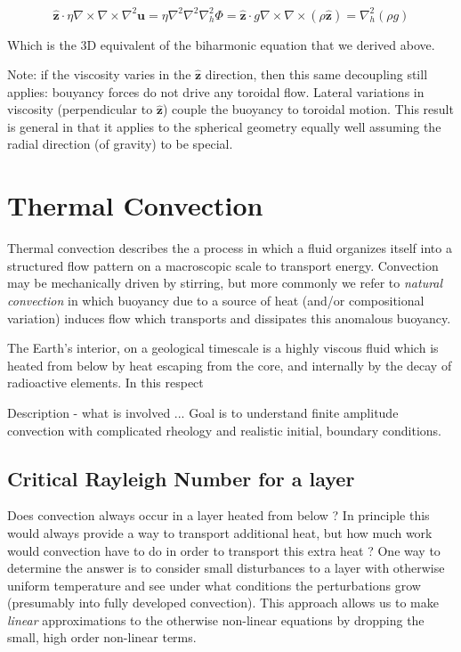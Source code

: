 \documentclass[10pt]{article}
\begin{document}
\begin{equation}
	\hat{\mathbf{z}} \cdot \eta \nabla \times \nabla \times \nabla^2 \mathbf{u} = 
	    \eta \nabla^2 \nabla^2 \nabla_h^2 \Phi = 
		\hat{\mathbf{z}} \cdot g \nabla \times \nabla \times \left( \rho \hat{\mathbf{z}}\right) = 
		 \nabla_h^2 (\rho g)
\end{equation}

Which is the 3D equivalent of the biharmonic equation that we derived above.

Note: if the viscosity varies in the $\hat{\mathbf{z}}$ direction, then this same decoupling still applies: bouyancy forces do not drive any toroidal flow. Lateral variations in viscosity (perpendicular to $\hat{\mathbf{z}}$) couple the buoyancy to toroidal motion. This result is general in that it applies to the spherical geometry equally well assuming the radial direction (of gravity) to be special. 
		
\section{Thermal Convection}
	
Thermal convection describes the a process in which a fluid organizes itself into 
a structured flow pattern on a macroscopic scale to transport energy. Convection
may be mechanically driven by stirring, but more commonly we refer to \emph{natural 
convection} in which buoyancy due to a source of heat (and/or compositional variation) induces
flow which transports and dissipates this anomalous buoyancy.
	
The Earth's interior, on a geological timescale is a highly viscous fluid which is heated
from below by heat escaping from the core, and internally by the decay of radioactive elements.
In this respect 
	
	Description - what is involved ...
	Goal is to understand finite amplitude convection with
	complicated rheology and realistic initial, boundary 
	conditions.
		
		
\subsection{Critical Rayleigh Number for a layer}
	
		Does convection always occur in a layer heated from below ? In
        principle this would always provide a way to transport additional
        heat, but how much work would convection have to do in order to
        transport this extra heat ? One way to determine the answer is to
        consider small disturbances to a layer with otherwise uniform
        temperature and see under what conditions the perturbations grow
        (presumably into fully developed convection). This approach allows us
        to make {\em linear} approximations to the otherwise non-linear
        equations by dropping the small, high order non-linear terms.
		
\end{document}
